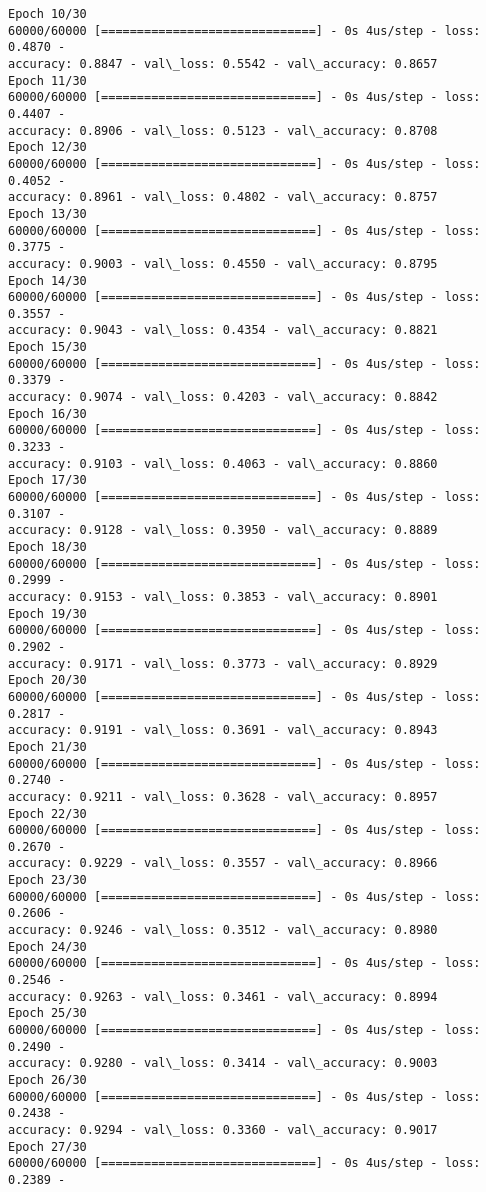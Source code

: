 \documentclass[11pt]{article}
\begin{document}
\begin{Verbatim}[commandchars=\\\{\}]
Epoch 10/30
60000/60000 [==============================] - 0s 4us/step - loss: 0.4870 -
accuracy: 0.8847 - val\_loss: 0.5542 - val\_accuracy: 0.8657
Epoch 11/30
60000/60000 [==============================] - 0s 4us/step - loss: 0.4407 -
accuracy: 0.8906 - val\_loss: 0.5123 - val\_accuracy: 0.8708
Epoch 12/30
60000/60000 [==============================] - 0s 4us/step - loss: 0.4052 -
accuracy: 0.8961 - val\_loss: 0.4802 - val\_accuracy: 0.8757
Epoch 13/30
60000/60000 [==============================] - 0s 4us/step - loss: 0.3775 -
accuracy: 0.9003 - val\_loss: 0.4550 - val\_accuracy: 0.8795
Epoch 14/30
60000/60000 [==============================] - 0s 4us/step - loss: 0.3557 -
accuracy: 0.9043 - val\_loss: 0.4354 - val\_accuracy: 0.8821
Epoch 15/30
60000/60000 [==============================] - 0s 4us/step - loss: 0.3379 -
accuracy: 0.9074 - val\_loss: 0.4203 - val\_accuracy: 0.8842
Epoch 16/30
60000/60000 [==============================] - 0s 4us/step - loss: 0.3233 -
accuracy: 0.9103 - val\_loss: 0.4063 - val\_accuracy: 0.8860
Epoch 17/30
60000/60000 [==============================] - 0s 4us/step - loss: 0.3107 -
accuracy: 0.9128 - val\_loss: 0.3950 - val\_accuracy: 0.8889
Epoch 18/30
60000/60000 [==============================] - 0s 4us/step - loss: 0.2999 -
accuracy: 0.9153 - val\_loss: 0.3853 - val\_accuracy: 0.8901
Epoch 19/30
60000/60000 [==============================] - 0s 4us/step - loss: 0.2902 -
accuracy: 0.9171 - val\_loss: 0.3773 - val\_accuracy: 0.8929
Epoch 20/30
60000/60000 [==============================] - 0s 4us/step - loss: 0.2817 -
accuracy: 0.9191 - val\_loss: 0.3691 - val\_accuracy: 0.8943
Epoch 21/30
60000/60000 [==============================] - 0s 4us/step - loss: 0.2740 -
accuracy: 0.9211 - val\_loss: 0.3628 - val\_accuracy: 0.8957
Epoch 22/30
60000/60000 [==============================] - 0s 4us/step - loss: 0.2670 -
accuracy: 0.9229 - val\_loss: 0.3557 - val\_accuracy: 0.8966
Epoch 23/30
60000/60000 [==============================] - 0s 4us/step - loss: 0.2606 -
accuracy: 0.9246 - val\_loss: 0.3512 - val\_accuracy: 0.8980
Epoch 24/30
60000/60000 [==============================] - 0s 4us/step - loss: 0.2546 -
accuracy: 0.9263 - val\_loss: 0.3461 - val\_accuracy: 0.8994
Epoch 25/30
60000/60000 [==============================] - 0s 4us/step - loss: 0.2490 -
accuracy: 0.9280 - val\_loss: 0.3414 - val\_accuracy: 0.9003
Epoch 26/30
60000/60000 [==============================] - 0s 4us/step - loss: 0.2438 -
accuracy: 0.9294 - val\_loss: 0.3360 - val\_accuracy: 0.9017
Epoch 27/30
60000/60000 [==============================] - 0s 4us/step - loss: 0.2389 -

\end{Verbatim}
\end{document}
